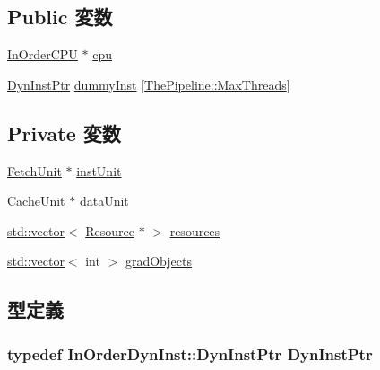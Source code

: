\subsection*{Public 変数}
\begin{DoxyCompactItemize}
\item 
\hyperlink{classInOrderCPU}{InOrderCPU} $\ast$ \hyperlink{classResourcePool_a41d682c28d0f49e04393c52815808782}{cpu}
\item 
\hyperlink{classRefCountingPtr}{DynInstPtr} \hyperlink{classResourcePool_a8f57f75c5150b34b12a0d461a8941704}{dummyInst} \mbox{[}\hyperlink{namespaceThePipeline_ac9c0bbe9cf27d93e08ea8ccc4096e633}{ThePipeline::MaxThreads}\mbox{]}
\end{DoxyCompactItemize}
\subsection*{Private 変数}
\begin{DoxyCompactItemize}
\item 
\hyperlink{classFetchUnit}{FetchUnit} $\ast$ \hyperlink{classResourcePool_a693ed6c316127146b1da381cddea5ef9}{instUnit}
\item 
\hyperlink{classCacheUnit}{CacheUnit} $\ast$ \hyperlink{classResourcePool_a35963c6401a395a10f1b0d8eeb84e1ed}{dataUnit}
\item 
\hyperlink{classstd_1_1vector}{std::vector}$<$ \hyperlink{classResource}{Resource} $\ast$ $>$ \hyperlink{classResourcePool_a46a3c49c7a2cc60b053ccc0fecdfc334}{resources}
\item 
\hyperlink{classstd_1_1vector}{std::vector}$<$ int $>$ \hyperlink{classResourcePool_a62c7474a6f50366616afac7a3af89f08}{gradObjects}
\end{DoxyCompactItemize}


\subsection{型定義}
\hypertarget{classResourcePool_a32d1573770d3d1d96a1741ac80433e33}{
\subsubsection[{DynInstPtr}]{\setlength{\rightskip}{0pt plus 5cm}typedef {\bf InOrderDynInst::DynInstPtr} {\bf DynInstPtr}}}
\label{classResourcePool_a32d1573770d3d1d96a1741ac80433e33}



